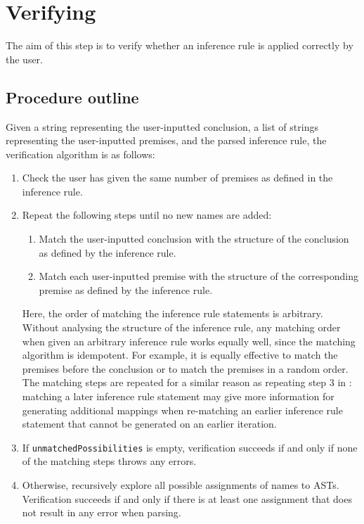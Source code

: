 \section{Verifying}
\label{checking:verifying}
The aim of this step is to verify whether an inference rule is applied correctly by the user.

\subsection{Procedure outline}
Given a string representing the user-inputted conclusion, a list of strings representing the user-inputted premises, and the parsed inference rule, the verification algorithm is as follows:
\begin{enumerate}
    \item Check the user has given the same number of premises as defined in the inference rule.
    \item Repeat the following steps until no new names are added:
    \begin{enumerate}
        \item Match the user-inputted conclusion with the structure of the conclusion as defined by the inference rule.
        \item Match each user-inputted premise with the structure of the corresponding premise as defined by the inference rule.
    \end{enumerate}
    Here, the order of matching the inference rule statements is arbitrary. Without analysing the structure of the inference rule, any matching order~ when given an arbitrary inference rule works equally well, since the matching algorithm is idempotent. For example, it is equally effective to match the premises before the conclusion or to match the premises in a random order. The matching steps are repeated for a similar reason as repeating step 3 in : matching a later inference rule statement may give more information for generating additional mappings when re-matching an earlier inference rule statement that cannot be generated on an earlier iteration.
    \item If \lstinline{unmatchedPossibilities} is empty, verification succeeds if and only if none of the matching steps throws any errors.
    \item Otherwise, recursively explore all possible assignments of names to ASTs. Verification succeeds if and only if there is at least one assignment that does not result in any error when parsing.
\end{enumerate}